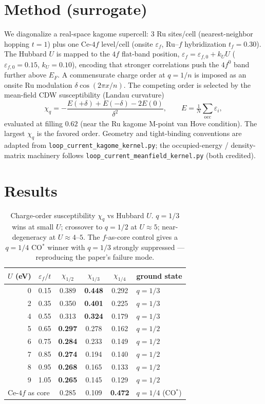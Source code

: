 \documentclass[11pt]{article}
\begin{document}
\section{Method (surrogate)}
We diagonalize a real-space kagome supercell: 3 Ru sites/cell (nearest-neighbor
hopping $t=1$) plus one Ce-$4f$ level/cell (onsite $\varepsilon_f$, Ru--$f$
hybridization $t_f=0.30$). The Hubbard $U$ is mapped to the $4f$ flat-band
position, $\varepsilon_f=\varepsilon_{f,0}+k_U U$ ($\varepsilon_{f,0}=0.15$,
$k_U=0.10$), encoding that stronger correlations push the $4f^0$ band further above
$E_F$. A commensurate charge order at $q=1/n$ is imposed as an onsite Ru modulation
$\delta\cos(2\pi x/n)$. The competing order is selected by the mean-field CDW
susceptibility (Landau curvature)
\begin{equation}
\chi_q = -\frac{E(+\delta)+E(-\delta)-2E(0)}{\delta^2},\qquad
E=\tfrac{1}{N}\!\!\sum_{\text{occ}}\!\varepsilon_i ,
\end{equation}
evaluated at filling $0.62$ (near the Ru kagome M-point van Hove condition). The
largest $\chi_q$ is the favored order. Geometry and tight-binding conventions are
adapted from \texttt{loop\_current\_kagome\_kernel.py}; the occupied-energy /
density-matrix machinery follows \texttt{loop\_current\_meanfield\_kernel.py}
(both credited).

\section{Results}
\begin{table}[h]\centering
\begin{tabular}{rccccl}
\toprule
$U$ (eV) & $\varepsilon_f/t$ & $\chi_{1/2}$ & $\chi_{1/3}$ & $\chi_{1/4}$ & ground state\\
\midrule
0 & 0.15 & 0.389 & \textbf{0.448} & 0.292 & $q=1/3$\\
2 & 0.35 & 0.350 & \textbf{0.401} & 0.225 & $q=1/3$\\
4 & 0.55 & 0.313 & \textbf{0.324} & 0.179 & $q=1/3$\\
5 & 0.65 & \textbf{0.297} & 0.278 & 0.162 & $q=1/2$\\
6 & 0.75 & \textbf{0.284} & 0.233 & 0.149 & $q=1/2$\\
7 & 0.85 & \textbf{0.274} & 0.194 & 0.140 & $q=1/2$\\
8 & 0.95 & \textbf{0.268} & 0.165 & 0.133 & $q=1/2$\\
9 & 1.05 & \textbf{0.265} & 0.145 & 0.129 & $q=1/2$\\
\midrule
\multicolumn{2}{l}{Ce-$4f$ as core} & 0.285 & 0.109 & \textbf{0.472} & $q=1/4$ (CO$^*$)\\
\bottomrule
\end{tabular}
\caption{Charge-order susceptibility $\chi_q$ vs Hubbard $U$. $q=1/3$ wins at
small $U$; crossover to $q=1/2$ at $U\!\approx\!5$; near-degeneracy at
$U\!\approx\!4$--$5$. The $f$-as-core control gives a $q=1/4$ CO$^*$ winner with
$q=1/3$ strongly suppressed --- reproducing the paper's failure mode.}
\end{table}
\end{document}
